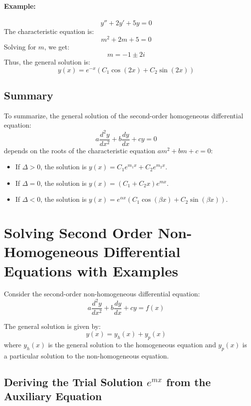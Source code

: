 \documentclass[a4paper,12pt]{article}
\begin{document}
\paragraph{Example:}
\[
y'' + 2y' + 5y = 0
\]
The characteristic equation is:
\[
m^2 + 2m + 5 = 0
\]
Solving for \(m\), we get:
\[
m = -1 \pm 2i
\]
Thus, the general solution is:
\[
y(x) = e^{-x} (C_1 \cos(2x) + C_2 \sin(2x))
\]

\subsection*{Summary}
To summarize, the general solution of the second-order homogeneous differential equation:
\[
a \frac{d^2 y}{dx^2} + b \frac{dy}{dx} + c y = 0
\]
depends on the roots of the characteristic equation \(am^2 + bm + c = 0\):

\begin{itemize}
    \item If \(\Delta > 0\), the solution is \(y(x) = C_1 e^{m_1 x} + C_2 e^{m_2 x}\).
    \item If \(\Delta = 0\), the solution is \(y(x) = (C_1 + C_2 x) e^{m x}\).
    \item If \(\Delta < 0\), the solution is \(y(x) = e^{\alpha x} (C_1 \cos(\beta x) + C_2 \sin(\beta x))\).
\end{itemize}

\section*{Solving Second Order Non-Homogeneous Differential Equations with Examples}

Consider the second-order non-homogeneous differential equation:
\[
a \frac{d^2 y}{dx^2} + b \frac{dy}{dx} + c y = f(x)
\]

The general solution is given by:
\[
y(x) = y_h(x) + y_p(x)
\]
where \(y_h(x)\) is the general solution to the homogeneous equation and \(y_p(x)\) is a particular solution to the non-homogeneous equation.

\subsection*{Deriving the Trial Solution \(e^{mx}\) from the Auxiliary Equation}
\end{document}
